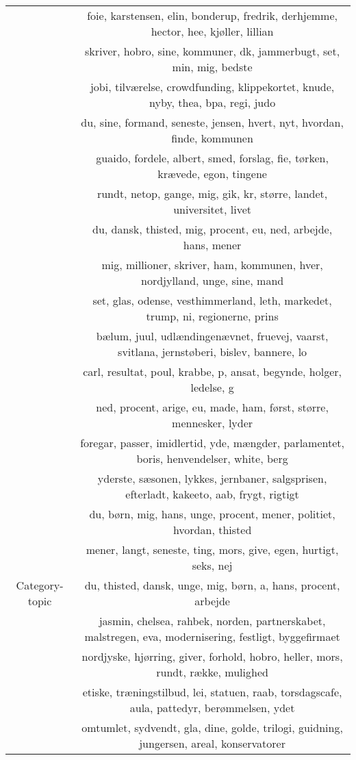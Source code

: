 \begin{table}
\begin{tabular}{c|c}
		& foie, karstensen, elin, bonderup, fredrik, derhjemme, hector, hee, kjøller, lillian \\
		& skriver, hobro, sine, kommuner, dk, jammerbugt, set, min, mig, bedste \\
		& jobi, tilværelse, crowdfunding, klippekortet, knude, nyby, thea, bpa, regi, judo \\
		& du, sine, formand, seneste, jensen, hvert, nyt, hvordan, finde, kommunen \\
		& guaido, fordele, albert, smed, forslag, fie, tørken, krævede, egon, tingene \\
		& rundt, netop, gange, mig, gik, kr, større, landet, universitet, livet \\
		& du, dansk, thisted, mig, procent, eu, ned, arbejde, hans, mener \\
		& mig, millioner, skriver, ham, kommunen, hver, nordjylland, unge, sine, mand \\
		& set, glas, odense, vesthimmerland, leth, markedet, trump, ni, regionerne, prins \\
		& bælum, juul, udlændingenævnet, fruevej, vaarst, svitlana, jernstøberi, bislev, bannere, lo \\
		& carl, resultat, poul, krabbe, p, ansat, begynde, holger, ledelse, g \\
		& ned, procent, arige, eu, made, ham, først, større, mennesker, lyder \\
		\midrule
		\multirow{15}{*}{Category-topic} & foregar, passer, imidlertid, yde, mængder, parlamentet, boris, henvendelser, white, berg \\
		& yderste, sæsonen, lykkes, jernbaner, salgsprisen, efterladt, kakeeto, aab, frygt, rigtigt \\
		& du, børn, mig, hans, unge, procent, mener, politiet, hvordan, thisted \\
		& mener, langt, seneste, ting, mors, give, egen, hurtigt, seks, nej \\
		& du, thisted, dansk, unge, mig, børn, a, hans, procent, arbejde \\
		& jasmin, chelsea, rahbek, norden, partnerskabet, malstregen, eva, modernisering, festligt, byggefirmaet \\
		& nordjyske, hjørring, giver, forhold, hobro, heller, mors, rundt, række, mulighed \\
		& etiske, træningstilbud, lei, statuen, raab, torsdagscafe, aula, pattedyr, berømmelsen, ydet \\
		& omtumlet, sydvendt, gla, dine, golde, trilogi, guidning, jungersen, areal, konservatorer \\

\end{tabular}
\end{table}
